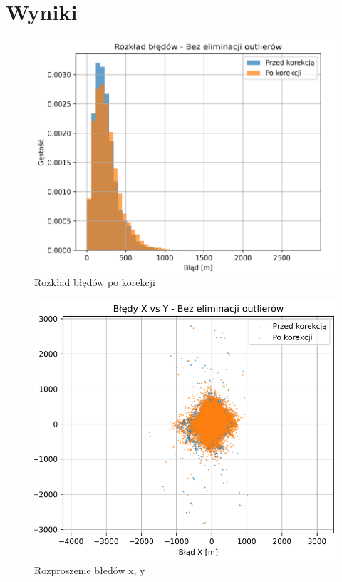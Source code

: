 \documentclass{classrep}
\begin{document}
\section{Wyniki} {
  \begin{figure}[h!]
	  \centering
	  \includegraphics[scale=0.40]{gestoscBl.png}
	  \caption{Rozkład błędów po korekcji}
	  \label{fig:density}
  \end{figure}
  \begin{figure}[h!]
	  \centering
	  \includegraphics[scale=0.40]{rozkladBl.png}
	  \caption{Rozproszenie błedów x, y}
	  \label{fig:błedyXY}

\end{figure}}
\end{document}
